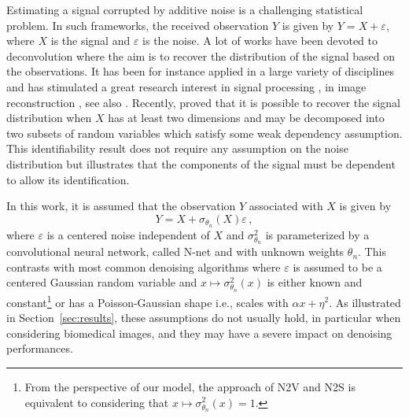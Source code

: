 \documentclass{article}
\begin{document}
Estimating a signal corrupted by additive noise  is a challenging statistical problem. In such frameworks, the received observation $Y$ is given by $Y = X + \varepsilon$,  where $X$ is the signal and $\varepsilon$ is the noise. A lot of works have been devoted to deconvolution where the aim is to recover the distribution of the signal based on the observations. It has been for instance applied in a large variety of disciplines and has stimulated a great research interest in signal processing \cite{moulines1997maximum,attias1998blind}, in image reconstruction \cite{kundur1996blind,campisi2017blind}, see also  \cite{meister:2009}. Recently, \cite{gassiat:lecorff:lehericy:2021} proved that it is possible to recover the signal distribution when $X$ has at least two dimensions and may be decomposed into two subsets of random variables which satisfy some weak dependency assumption. This identifiability result does not require any assumption on the noise distribution but illustrates that the components of the signal must be dependent to allow its identification. %

In this work, it is assumed that the observation $Y$ associated with $X$  is given by
\begin{equation}
\label{eq:def:Y}
Y = X + \sigma_{\theta_n}(X)\varepsilon\,,
\end{equation}
where $\varepsilon$ is a centered noise independent of $X$ and $\sigma^2_{\theta_n}$ is parameterized by a convolutional neural network, called N-net and with unknown weights $\theta_n$.
This contrasts with most common denoising algorithms where $\varepsilon$ is assumed to be a centered Gaussian random variable and  $x\mapsto \sigma^2_{\theta_n}(x)$ is either known and constant\footnote{From the perspective of our model, the approach of N2V and N2S is equivalent to considering that $x\mapsto \sigma^2_{\theta_n}(x) = 1$.} or has a Poisson-Gaussian shape i.e., scales with $\alpha x + \eta^2$.
As illustrated in Section~\ref{sec:results}, these assumptions do not usually hold, in particular when considering biomedical images, and they may have a severe impact on denoising performances.
\end{document}
